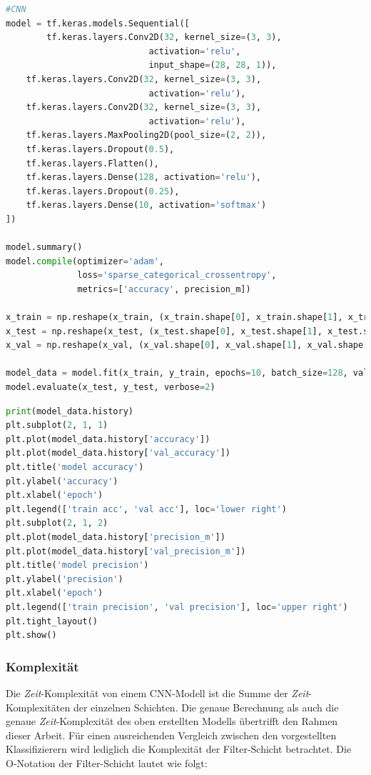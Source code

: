 \begin{minipage}{\textwidth}
	\begin{lstlisting}[language=Python, caption=Pythoncode zur Konstuktion vom CNN, label=lst:test_cnn]
#CNN
model = tf.keras.models.Sequential([
		tf.keras.layers.Conv2D(32, kernel_size=(3, 3),
							activation='relu',
							input_shape=(28, 28, 1)),
	tf.keras.layers.Conv2D(32, kernel_size=(3, 3),
							activation='relu'),
	tf.keras.layers.Conv2D(32, kernel_size=(3, 3),
							activation='relu'),
	tf.keras.layers.MaxPooling2D(pool_size=(2, 2)),
	tf.keras.layers.Dropout(0.5),
	tf.keras.layers.Flatten(),
	tf.keras.layers.Dense(128, activation='relu'),
	tf.keras.layers.Dropout(0.25),
	tf.keras.layers.Dense(10, activation='softmax')
])

model.summary()
model.compile(optimizer='adam',
              loss='sparse_categorical_crossentropy',
              metrics=['accuracy', precision_m])

x_train = np.reshape(x_train, (x_train.shape[0], x_train.shape[1], x_train.shape[2], 1))
x_test = np.reshape(x_test, (x_test.shape[0], x_test.shape[1], x_test.shape[2], 1))
x_val = np.reshape(x_val, (x_val.shape[0], x_val.shape[1], x_val.shape[2], 1))
				
model_data = model.fit(x_train, y_train, epochs=10, batch_size=128, validation_data=(x_val, y_val))
model.evaluate(x_test, y_test, verbose=2)
\end{lstlisting}
\end{minipage}

\begin{minipage}{\textwidth}
	\begin{lstlisting}[language=Python, caption=Pythoncode zum Darstellen der Daten, label=lst:test_plot_cnn]
print(model_data.history)
plt.subplot(2, 1, 1)
plt.plot(model_data.history['accuracy'])
plt.plot(model_data.history['val_accuracy'])
plt.title('model accuracy')
plt.ylabel('accuracy')
plt.xlabel('epoch')
plt.legend(['train acc', 'val acc'], loc='lower right')
plt.subplot(2, 1, 2)
plt.plot(model_data.history['precision_m'])
plt.plot(model_data.history['val_precision_m'])
plt.title('model precision')
plt.ylabel('precision')
plt.xlabel('epoch')
plt.legend(['train precision', 'val precision'], loc='upper right')
plt.tight_layout()
plt.show()
	\end{lstlisting}
\end{minipage}

\subsubsection{Komplexität}
Die \textit{Zeit}-Komplexität von einem CNN-Modell ist die Summe der \textit{Zeit}-Komplexitäten der einzelnen Schichten. Die genaue Berechnung als auch die genaue \textit{Zeit}-Komplexität des oben erstellten Modells übertrifft den Rahmen dieser Arbeit. Für einen ausreichenden Vergleich zwischen den vorgestellten Klassifizierern wird lediglich die Komplexität der Filter-Schicht betrachtet. Die O-Notation der Filter-Schicht lautet wie folgt:

